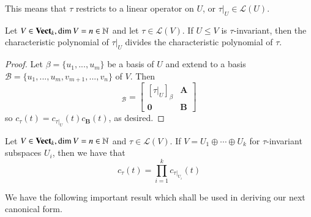 This means that $\tau$ restricts to a linear operator on $U$, or $\tau\vert_U \in \mathcal{L}(U)$. 

\begin{theorem}
    Let $V \in\normalfont\textbf{Vect}_{k}, \dim V =n\in\mathbb N$ and let $\tau \in \mathcal{L}(V)$. If $U \leq V$ is $\tau$-invariant, then the characteristic polynomial of $\tau\vert_U$ divides the characteristic polynomial of $\tau$.
\end{theorem}
\begin{proof}
    Let $\beta = \{u_1,...,u_m\}$ be a basis of $U$ and extend to a basis $\mathcal{B} = \{u_1,...,u_m,v_{m+1},...,v_n\}$ of $V$. Then \begin{equation*}
        [\tau]_{\mathcal{B}} = \begin{bmatrix} [\tau\vert_U]_{\beta} & \mathbf{A} \\ \mathbf{0} & \mathbf{B} \end{bmatrix}
    \end{equation*}
    so $c_{\tau}(t) = c_{\tau\vert_U}(t)c_{\mathbf{B}}(t)$, as desired.
\end{proof}

\begin{corollary}
    Let $V \in \normalfont\textbf{Vect}_{k},\dim V = n\in\mathbb N$ and $\tau \in \mathcal{L}(V)$. If $V = U_1\oplus \cdots \oplus U_k$ for $\tau$-invariant subspaces $U_i$, then we have that \begin{equation*}
        c_{\tau}(t) = \prod_{i=1}^kc_{\tau\vert_{U_i}}(t)
    \end{equation*}
\end{corollary}

We have the following important result which shall be used in deriving our next canonical form.

